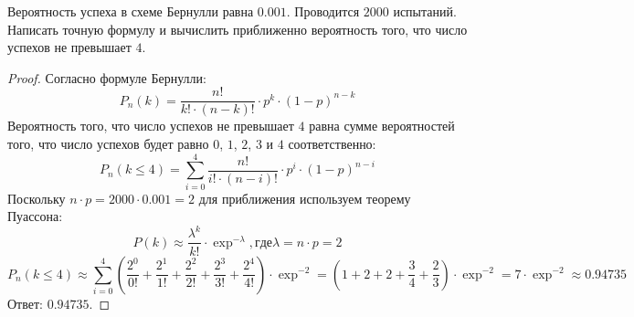 \begin{problem}
	Вероятность успеха в схеме Бернулли равна $0.001$. Проводится $2000$ испытаний. Написать точную формулу и вычислить приближенно вероятность того, что число успехов не превышает $4$.
\end{problem}

\begin{proof}
	Согласно формуле Бернулли:
	\[	
		P_n(k)=\frac{n!}{k!\cdot(n-k)!}\cdot p^k\cdot(1-p)^{n-k}
	\]
	Вероятность того, что число успехов не превышает $4$ равна сумме вероятностей того, что число успехов будет равно $0$, $1$, $2$, $3$ и $4$ соответственно:
	\[
		P_n(k\leq4)=\sum_{i=0}^{4}\frac{n!}{i!\cdot(n-i)!}\cdot p^i\cdot(1-p)^{n-i}
	\]
	Поскольку $n\cdot p=2000\cdot0.001=2$ для приближения используем теорему Пуассона:
	\[
		P(k)\approx\frac{\lambda^k}{k!}\cdot\exp^{-\lambda}, где \lambda=n\cdot p=2
	\]
	\[
		P_n(k\leq4)\approx\sum_{i=0}^{4}(\frac{2^0}{0!}+\frac{2^1}{1!}+\frac{2^2}{2!}+\frac{2^3}{3!}+\frac{2^4}{4!})\cdot\exp^{-2}=(1+2+2+\frac{3}{4}+\frac{2}{3})\cdot\exp^{-2}=7\cdot\exp^{-2}\approx0.94735
	\]
	Ответ: $0.94735$.
\end{proof}